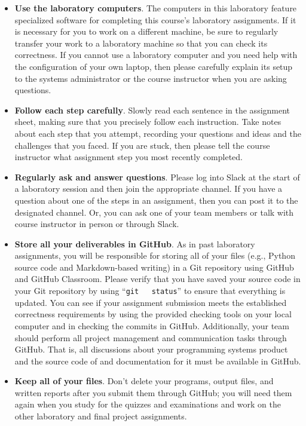 \documentclass[11pt]{article}
\newcommand{\command}[1]{``\lstinline{#1}''}
\begin{document}
\begin{itemize}
  \setlength{\itemsep}{0pt}

\item {\bf Use the laboratory computers}. The computers in this laboratory feature specialized software for completing
  this course's laboratory  assignments. If it is necessary for you to work on a different machine, be sure to regularly
  transfer your work to a laboratory machine so that you can check its correctness. If you cannot use a laboratory
  computer and you need help with the configuration of your own laptop, then please carefully explain its setup to the
  systems administrator or the course instructor when you are asking questions.

\item {\bf Follow each step carefully}. Slowly read each sentence in the assignment sheet, making sure that you
  precisely follow each instruction. Take notes about each step that you attempt, recording your questions and ideas and
  the challenges that you faced. If you are stuck, then please tell the course instructor what assignment step you
  most recently completed.

\item {\bf Regularly ask and answer questions}. Please log into Slack at the start of a laboratory session and then join
  the appropriate channel. If you have a question about one of the steps in an assignment, then you can post it to the
  designated channel. Or, you can ask one of your team members or talk with course instructor in person or through
  Slack.

\item {\bf Store all your deliverables in GitHub}. As in past laboratory assignments, you will be responsible for
  storing all of your files (e.g., Python source code and Markdown-based writing) in a Git repository using GitHub and
  GitHub Classroom. Please verify that you have saved your source code in your Git repository by using \command{git
  status} to ensure that everything is updated. You can see if your assignment submission meets the established
  correctness requirements by using the provided checking tools on your local computer and in checking the commits in
  GitHub. Additionally, your team should perform all project management and communication tasks through GitHub. That is,
  all discussions about your programming systems product and the source code of and documentation for it must be
  available in GitHub.

\item {\bf Keep all of your files}. Don't delete your programs, output files, and written reports after you submit them
  through GitHub; you will need them again when you study for the quizzes and examinations and work on the other
  laboratory and final project assignments.


\end{itemize}
\end{document}
